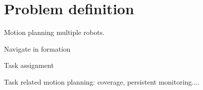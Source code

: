 
\section{Problem definition}\label{sec:2}

Motion planning multiple robots.

Navigate in formation

Task assignment

Task related motion planning: coverage, persistent monitoring....


